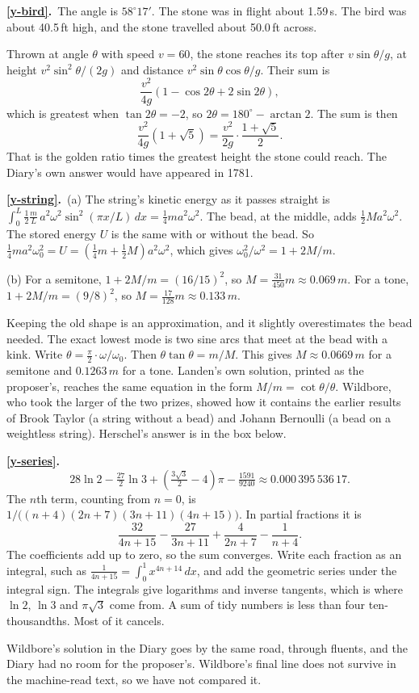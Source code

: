 \documentclass[11pt,a4paper]{article}
\newcommand{\ans}[2]{\par\smallskip\noindent\textbf{\ref{#1}.}\ #2}
\begin{document}
\ans{y-bird}{The angle is $58^\circ17'$. The stone was in flight about 1.59\,s. The bird
was about 40.5\,ft high, and the stone travelled about 50.0\,ft across.

Thrown at angle $\theta$ with speed $v = 60$, the stone reaches its top after
$v\sin\theta/g$, at height $v^2\sin^2\theta/(2g)$ and distance $v^2\sin\theta\cos\theta/g$.
Their sum is
\[
\frac{v^2}{4g}\left(1 - \cos2\theta + 2\sin2\theta\right),
\]
which is greatest when $\tan2\theta = -2$, so $2\theta = 180^\circ - \arctan2$. The sum is
then
\[
\frac{v^2}{4g}\left(1 + \sqrt5\right) = \frac{v^2}{2g}\cdot\frac{1+\sqrt5}{2}.
\]
That is the golden ratio times the greatest height the stone could reach. The Diary's
own answer would have appeared in 1781.}

\ans{y-string}{(a) The string's kinetic energy as it passes straight is
$\int_0^L \tfrac12\tfrac mL\,a^2\omega^2\sin^2(\pi x/L)\,dx = \tfrac14 m a^2\omega^2$. The
bead, at the middle, adds $\tfrac12 M a^2\omega^2$. The stored energy $U$ is the same with
or without the bead. So $\tfrac14 m a^2\omega_0^2 = U = \left(\tfrac14 m + \tfrac12 M\right)a^2\omega^2$,
which gives $\omega_0^2/\omega^2 = 1 + 2M/m$.

(b) For a semitone, $1 + 2M/m = (16/15)^2$, so $M = \tfrac{31}{450}m \approx 0.069\,m$. For
a tone, $1 + 2M/m = (9/8)^2$, so $M = \tfrac{17}{128}m \approx 0.133\,m$.

Keeping the old shape is an approximation, and it slightly overestimates the bead
needed. The exact lowest mode is two sine arcs that meet at the bead with a kink. Write
$\theta = \tfrac\pi2\cdot\omega/\omega_0$. Then $\theta\tan\theta = m/M$. This gives
$M \approx 0.0669\,m$ for a semitone and $0.1263\,m$ for a tone. Landen's own solution,
printed as the proposer's, reaches the same equation in the form
$M/m = \cot\theta/\theta$. Wildbore, who took the larger of the two prizes, showed how it contains the
earlier results of Brook Taylor (a string without a bead) and Johann Bernoulli (a bead on
a weightless string). Herschel's answer is in the box below.}

\ans{y-series}{
\[
28\ln2 - \tfrac{27}{2}\ln3 + \left(\tfrac{3\sqrt3}{2} - 4\right)\pi - \tfrac{1591}{9240}
\approx 0.000\,395\,536\,17.
\]
The $n$th term, counting from $n = 0$, is $1/\big((n+4)(2n+7)(3n+11)(4n+15)\big)$. In
partial fractions it is
\[
\frac{32}{4n+15} - \frac{27}{3n+11} + \frac{4}{2n+7} - \frac{1}{n+4}.
\]
The coefficients add up to zero, so the sum converges. Write each fraction as an
integral, such as $\frac1{4n+15} = \int_0^1 x^{4n+14}\,dx$, and add the geometric series
under the integral sign. The integrals give logarithms and inverse tangents, which is
where $\ln2$, $\ln3$ and $\pi\sqrt3$ come from. A sum of tidy numbers is less than
four ten-thousandths. Most of it cancels.

Wildbore's solution in the Diary goes by the same road, through fluents, and the
Diary had no room for the proposer's. Wildbore's final line does not survive in the
machine-read text, so we have not compared it.}
\end{document}
